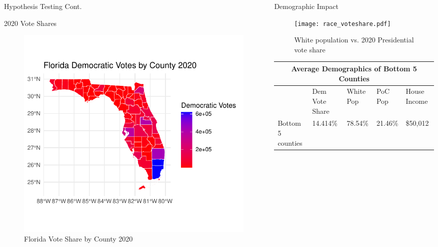 \documentclass[xcolor=dvipsnames]{beamer}
\newlength{\onecolwid}
\newlength{\twocolwid}
\begin{document}
\begin{frame}[t]
\begin{columns}[t]
\begin{column}{\twocolwid}
\begin{columns}[t,totalwidth=\twocolwid]
\begin{column}{\onecolwid}
\begin{block}{Hypothesis Testing Cont.}
\end{block}


\begin{block}{2020 Vote Shares}
\begin{figure}
\includegraphics[trim={1.45cm 1cm 1.25cm 1cm},clip,scale=2.7]{dem_votes2020.pdf}
\caption{Florida Vote Share by County 2020}
\end{figure}
\end{block}
\end{column} %
\begin{column}{\onecolwid}\vspace{-.6in} %


\begin{block}{Demographic Impact}

\begin{figure}
\texttt{[image: race\_voteshare.pdf]}
\caption{White population vs. 2020 Presidential vote share}
\end{figure}


\begin{tabular}{ |p{5.2cm}|p{5.9cm}|p{5cm}|p{4.2cm}|p{5cm}|}

 \hline
 \multicolumn{5}{|c|}{Average Demographics of Bottom 5 Counties} \\
 \hline
 & Dem Vote Share &White Pop &PoC Pop & House Income\\
 \hline
 Bottom 5 counties   & 14.414\%    &78.54\%&   21.46\% & \$50,012\\
 \hline


\end{tabular}
\end{block}
\end{column}
\end{columns}
\end{column}
\end{columns}
\end{frame}
\end{document}
